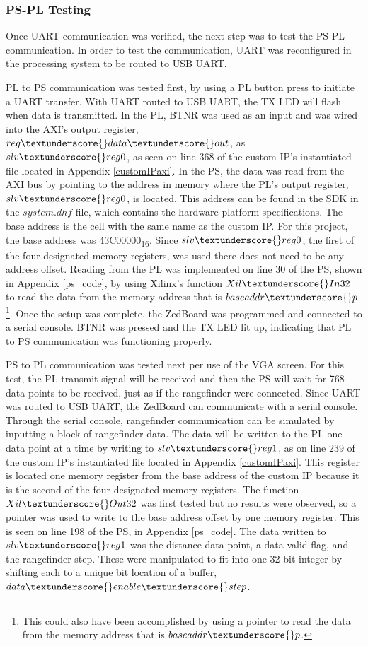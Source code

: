 \subsubsection{PS-PL Testing}
Once UART communication was verified, the next step was to test the PS-PL communication. In order to test the communication, UART was reconfigured in the processing system to be routed to USB UART.
\par
PL to PS communication was tested first, by using a PL button press to initiate a UART transfer. With UART routed to USB UART, the TX LED will flash when data is transmitted. In the PL, BTNR was used as an input and was wired into the AXI's output register, $reg\textunderscore{}data\textunderscore{}out$, as $slv\textunderscore{}reg0$, as seen on line 368 of the custom IP's instantiated file located in Appendix \ref{customIPaxi}. In the PS, the data was read from the AXI bus by pointing to the address in memory where the PL's output register, $slv\textunderscore{}reg0$, is located. This address can be found in the SDK in the $system.dhf$ file, which contains the hardware platform specifications. The base address is the cell with the same name as the custom IP. For this project, the base address was 43C00000\textsubscript{16}. Since $slv\textunderscore{}reg0$, the first of the four designated memory registers, was used there does not need to be any address offset. Reading from the PL was implemented on line 30 of the PS, shown in Appendix \ref{ps_code}, by using Xilinx's function $Xil\textunderscore{}In32$ to read the data from the memory address that is $baseaddr\textunderscore{}p$\footnote{This could also have been accomplished by using a pointer to read the data from the memory address that is $baseaddr\textunderscore{}p$.}. Once the setup was complete, the ZedBoard was programmed and connected to a serial console. BTNR was pressed and the TX LED lit up, indicating that PL to PS communication was functioning properly.
\par
PS to PL communication was tested next per use of the VGA screen. For this test, the PL transmit signal will be received and then the PS will wait for 768 data points to be received, just as if the rangefinder were connected. Since UART was routed to USB UART, the ZedBoard can communicate with a serial console. Through the serial console, rangefinder communication can be simulated by inputting a block of rangefinder data. The data will be written to the PL one data point at a time by writing to $slv\textunderscore{}reg1$, as on line 239 of the custom IP's instantiated file located in Appendix \ref{customIPaxi}. This register is located one memory register from the base address of the custom IP because it is the second of the four designated memory registers. The function $Xil\textunderscore{}Out32$ was first tested but no results were observed, so a pointer was used to write to the base address offset by one memory register. This is seen on line 198 of the PS, in Appendix \ref{ps_code}. The data written to $slv\textunderscore{}reg1$ was the distance data point, a data valid flag, and the rangefinder step. These were manipulated to fit into one 32-bit integer by shifting each to a unique bit location of a buffer, $data\textunderscore{}enable\textunderscore{}step$.
